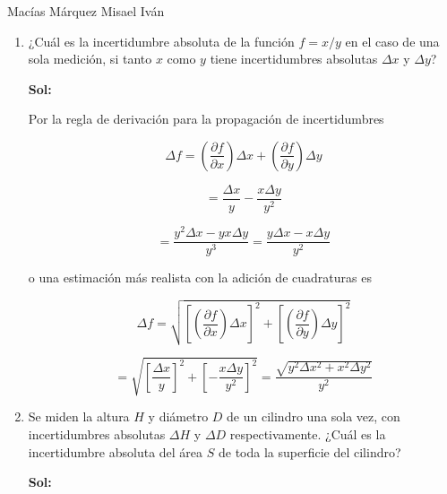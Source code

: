 \documentclass[12pt,a4paper]{article}
\begin{document}
Macías Márquez Misael Iván

\begin{enumerate}






\item ¿Cuál es la incertidumbre absoluta de la función $f=x/y$ en el caso de una sola medición, si tanto $x$ como $y$ tiene incertidumbres absolutas $\Delta x$ y $\Delta y$?

\textbf{Sol:}

Por la regla de derivación para la propagación de incertidumbres

\begin{equation*}
    \Delta f = \left(\frac{\partial f}{\partial x}\right) \Delta x + \left(\frac{\partial f}{\partial y}\right) \Delta y
\end{equation*}

\begin{equation*}
    = \frac{\Delta x}{ y} - \frac{x \Delta y}{y^2}
\end{equation*}

\begin{equation*}
    =\frac{y^2 \Delta x - yx \Delta y}{y^3} = \frac{y \Delta x - x \Delta y}{y^2}
\end{equation*}

o una estimación más realista con la adición de cuadraturas es

\begin{equation*}
    \Delta f = \sqrt{\left[\left(\frac{\partial f}{\partial x}\right) \Delta x\right]^2 + \left[\left(\frac{\partial f}{\partial y}\right) \Delta y\right]^2}
\end{equation*}

\begin{equation*}
    = \sqrt{\left[ \frac{\Delta x}{y}\right]^2 + \left[-\frac{x\Delta y}{y^2}\right]^2} = \frac{\sqrt{y^2 \Delta x^2 + x^2 \Delta y^2}}{y^2}
\end{equation*}






    
\item Se miden la altura $H$ y diámetro $D$ de un cilindro una sola vez, con incertidumbres absolutas $\Delta H$ y $\Delta D$ respectivamente. ¿Cuál es la incertidumbre absoluta del área $S$ de toda la superficie del cilindro?

\textbf{Sol:}


\end{enumerate}
\end{document}
